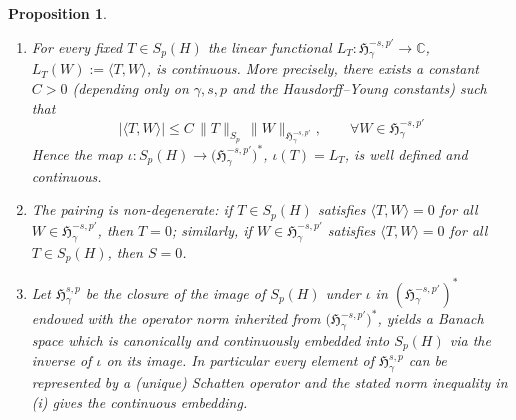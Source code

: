 \documentclass[11pt,a4paper]{article}
\newtheorem{proposition}[theorem]{Proposition}
\theoremstyle{definition}
\begin{document}
\begin{proposition}
\label{prop:pairing-duality}


\begin{enumerate} 

\item[(i)] For every fixed $T\in S_p(H)$ the linear functional
      $L_T : \mathfrak{H}^{-s,p'}_{\gamma}\to\mathbb{C}$, $L_T(W):=\langle T,W\rangle$, is continuous.
      More precisely, there exists a constant $C>0$ (depending only on $\gamma,s,p$ and the
      Hausdorff--Young constants) such that
      \[
      |\langle T,W\rangle| \le C\,\|T\|_{S_p}\,\|W\|_{\mathfrak{H}^{-s,p'}_{\gamma}},
      \qquad\forall W\in \mathfrak{H}^{-s,p'}_{\gamma}
      \]
      Hence the map $\iota: S_p(H)\to\bigl(\mathfrak{H}^{-s,p'}_{\gamma}\bigr)^*$, $\iota(T)=L_T$, is
      well defined and continuous.

\item[(ii)] The pairing is non-degenerate: if $T\in S_p(H)$ satisfies
      $\langle T,W\rangle=0$ for all $W\in \mathfrak{H}^{-s,p'}_{\gamma}$, then $T=0$; similarly,
      if $W\in \mathfrak{H}^{-s,p'}_{\gamma}$ satisfies $\langle T,W\rangle=0$ for all $T\in S_p(H)$,
      then $S=0$.

\item[(iii)] Let $\mathfrak{H}^{s,p}_\gamma$ be the closure of the image of $S_p(H)$ under $\iota$ in $(\mathfrak{H}^{-s,p'}_\gamma)^*$ endowed with the operator norm inherited from $\bigl(\mathfrak{H}^{-s,p'}_{\gamma}\bigr)^*$, yields a Banach space which is canonically and continuously embedded into $S_p(H)$ via the inverse of $\iota$ on its image. In particular every element of $\mathfrak{H}^{s,p}_{\gamma}$ can be represented by a (unique) Schatten operator and the stated norm inequality in (i) gives the continuous embedding.
\end{enumerate}
\end{proposition}
\end{document}

